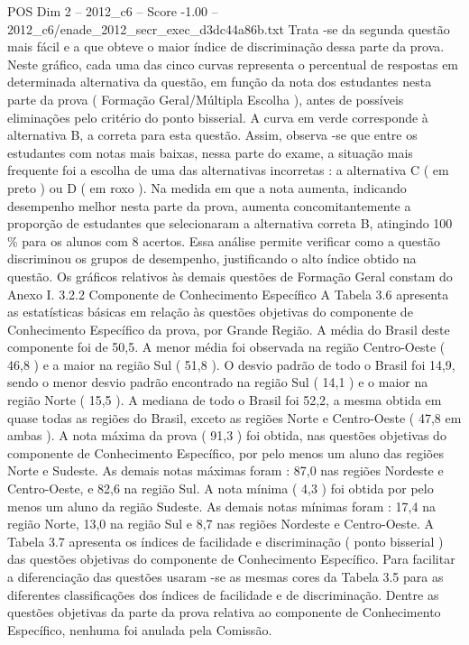 \begin{textsample}{POS Dim 2 – 2012\_c6 – Score -1.00 – 2012\_c6/enade\_2012\_secr\_exec\_d3dc44a86b.txt}
Trata -se da segunda questão mais fácil e a que obteve o maior índice de discriminação dessa parte da prova.
Neste gráfico, cada uma das cinco curvas representa o percentual de respostas em determinada alternativa da questão, em função da nota dos estudantes nesta parte da prova ( Formação Geral/Múltipla Escolha ), antes de possíveis eliminações pelo critério do ponto bisserial.
A curva em verde corresponde à alternativa B, a correta para esta questão.
Assim, observa -se que entre os estudantes com notas mais baixas, nessa parte do exame, a situação mais frequente foi a escolha de uma das alternativas incorretas : a alternativa C ( em preto ) ou D ( em roxo ).
Na medida em que a nota aumenta, indicando desempenho melhor nesta parte da prova, aumenta concomitantemente a proporção de estudantes que selecionaram a alternativa correta B, atingindo 100 \% para os alunos com 8 acertos.
Essa análise permite verificar como a questão discriminou os grupos de desempenho, justificando o alto índice obtido na questão.
Os gráficos relativos às demais questões de Formação Geral constam do Anexo I. 3.2.2 Componente de Conhecimento Específico A Tabela 3.6 apresenta as estatísticas básicas em relação às questões objetivas do componente de Conhecimento Específico da prova, por Grande Região.
A média do Brasil deste componente foi de 50,5.
A menor média foi observada na região Centro-Oeste ( 46,8 ) e a maior na região Sul ( 51,8 ).
O desvio padrão de todo o Brasil foi 14,9, sendo o menor desvio padrão encontrado na região Sul ( 14,1 ) e o maior na região Norte ( 15,5 ).
A mediana de todo o Brasil foi 52,2, a mesma obtida em quase todas as regiões do Brasil, exceto as regiões Norte e Centro-Oeste ( 47,8 em ambas ).
A nota máxima da prova ( 91,3 ) foi obtida, nas questões objetivas do componente de Conhecimento Específico, por pelo menos um aluno das regiões Norte e Sudeste.
As demais notas máximas foram : 87,0 nas regiões Nordeste e Centro-Oeste, e 82,6 na região Sul.
A nota mínima ( 4,3 ) foi obtida por pelo menos um aluno da região Sudeste.
As demais notas mínimas foram : 17,4 na região Norte, 13,0 na região Sul e 8,7 nas regiões Nordeste e Centro-Oeste.
A Tabela 3.7 apresenta os índices de facilidade e discriminação ( ponto bisserial ) das questões objetivas do componente de Conhecimento Específico.
Para facilitar a diferenciação das questões usaram -se as mesmas cores da Tabela 3.5 para as diferentes classificações dos índices de facilidade e de discriminação.
Dentre as questões objetivas da parte da prova relativa ao componente de Conhecimento Específico, nenhuma foi anulada pela Comissão.

\end{textsample}

